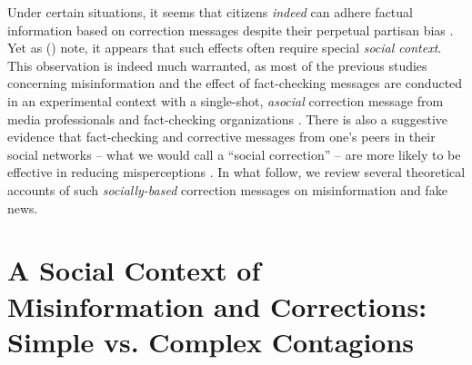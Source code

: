 \documentclass[man, 12pt, a4paper, nolmodern, noextraspace]{apa6}
\begin{document}
  Under certain situations, it seems that citizens \emph{indeed} can adhere factual information based on correction messages despite their perpetual partisan bias \parencite[e.g.,][]{Wood2018, nyhan2017taking}. Yet as \citeauthor{margolin2017} (\citeyear{margolin2017}) note, it appears that such effects often require special \emph{social context}. This observation is indeed much warranted, as most of the previous studies concerning misinformation and the effect of fact-checking messages are conducted in an experimental context with a single-shot, \emph{asocial} correction message from media professionals and fact-checking organizations \parencite[e.g.,][]{nyhan2010corrections,garrett2013undermining,weeks2015emotions}. There is also a suggestive evidence that fact-checking and corrective messages from one's peers in their social networks -- what we would call a \enquote{social correction} -- are more likely to be effective in reducing misperceptions \parencite[e.g.,][]{margolin2017, bode2017see}. In what follow, we review several theoretical accounts of such \emph{socially-based} correction messages on misinformation and fake news.   
      
\section{A Social Context of Misinformation and Corrections: Simple vs. Complex Contagions}
\end{document}
